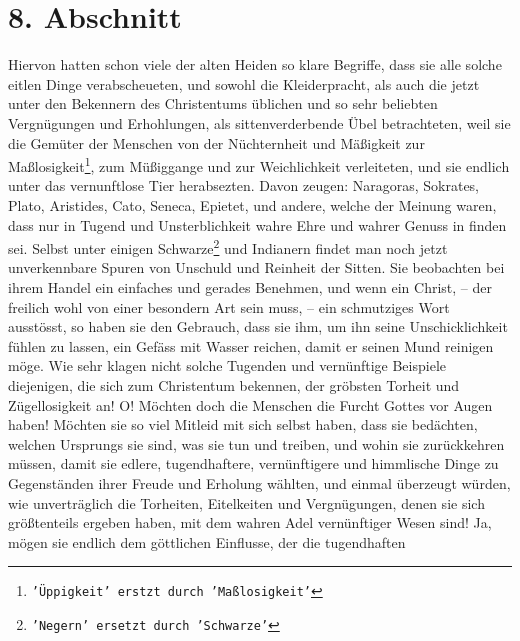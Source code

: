 \section{8. Abschnitt} \label{kap14_ab8}

Hiervon hatten schon viele der alten Heiden so klare
Begriffe, dass sie alle
solche eitlen Dinge verabscheueten, und sowohl die Kleiderpracht, als auch die
jetzt unter den Bekennern des Christentums üblichen und so sehr beliebten
Vergnügungen und Erhohlungen, als sittenverderbende Übel betrachteten, weil sie
die Gemüter der Menschen von der Nüchternheit und Mäßigkeit zur
Maßlosigkeit\footnote{\texttt{'Üppigkeit'
erstzt durch 'Maßlosigkeit'}}, zum
Müßiggange und zur Weichlichkeit verleiteten, und sie
endlich
unter das
vernunftlose Tier herabsezten. Davon zeugen:
Naragoras, Sokrates,
Plato,
Aristides, Cato,
Seneca,
Epietet, und andere, welche der Meinung waren, dass nur
in
Tugend und Unsterblichkeit wahre Ehre und wahrer
Genuss in
finden sei. Selbst
unter einigen Schwarze\footnote{\texttt{'Negern' ersetzt durch 'Schwarze'}}
 und Indianern findet man noch
jetzt unverkennbare
Spuren
von Unschuld und Reinheit der Sitten. Sie beobachten bei ihrem Handel ein
einfaches und gerades Benehmen, und wenn ein Christ, --
der freilich wohl von
einer besondern Art sein muss, -- ein schmutziges Wort ausstösst, so haben sie
den
Gebrauch, dass sie ihm, um ihn seine Unschicklichkeit fühlen zu lassen, ein
Gefäss mit Wasser reichen, damit er seinen Mund reinigen möge. Wie sehr klagen
nicht solche Tugenden und vernünftige Beispiele diejenigen, die sich zum
Christentum bekennen, der gröbsten Torheit und Zügellosigkeit an! O! Möchten
doch die Menschen die Furcht Gottes vor Augen haben! Möchten sie so viel Mitleid
mit sich selbst haben, dass sie bedächten, welchen Ursprungs sie sind, was sie
tun und treiben, und wohin sie zurückkehren müssen, damit sie edlere,
tugendhaftere, vernünftigere und himmlische Dinge zu Gegenständen ihrer Freude
und Erholung wählten, und einmal überzeugt würden, wie unverträglich die
Torheiten, Eitelkeiten und Vergnügungen, denen sie sich größtenteils ergeben
haben, mit dem wahren Adel vernünftiger Wesen sind! Ja, mögen sie endlich dem
göttlichen Einflusse, der die tugendhaften
